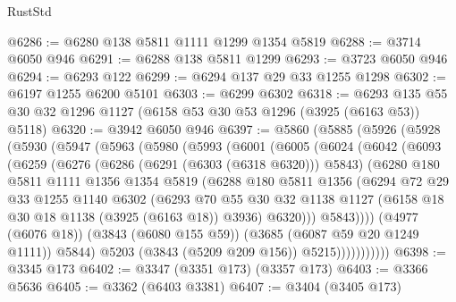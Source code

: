 \begin{lexlean}{RustStd}
\begin{coremodule}
@6286 := @6280 @138 @5811 @1111 @1299 @1354 @5819
@6288 := @3714 @6050 @946
@6291 := @6288 @138 @5811 @1299
@6293 := @3723 @6050 @946
@6294 := @6293 @122
@6299 := @6294 @137 @29 @33 @1255 @1298
@6302 := @6197 @1255 @6200 @5101
@6303 := @6299 @6302
@6318 := @6293 @135 @55 @30 @32 @1296 @1127 (@6158 @53 @30 @53 @1296 (@3925 (@6163 @53)) @5118)
@6320 := @3942 @6050 @946
@6397 := @5860
    (@5885
      (@5926
        (@5928
          (@5930
            (@5947
              (@5963
                (@5980
                  (@5993
                    (@6001
                      (@6005
                        (@6024
                          (@6042
                            (@6093
                              (@6259
                                (@6276
                                  (@6286 (@6291 (@6303 (@6318 @6320))) @5843)
                                  (@6280
                                    @180
                                    @5811
                                    @1111
                                    @1356
                                    @1354
                                    @5819
                                    (@6288
                                      @180
                                      @5811
                                      @1356
                                      (@6294
                                        @72
                                        @29
                                        @33
                                        @1255
                                        @1140
                                        @6302
                                        (@6293
                                          @70
                                          @55
                                          @30
                                          @32
                                          @1138
                                          @1127
                                          (@6158 @18 @30 @18 @1138 (@3925 (@6163 @18)) @3936)
                                          @6320)))
                                    @5843))))
                            (@4977 (@6076 @18))
                            (@3843 (@6080 @155 @59))
                            (@3685 (@6087 @59 @20 @1249 @1111))
                            @5844)
                          @5203
                          (@3843 (@5209 @209 @156))
                          @5215)))))))))))
@6398 := @3345 @173
@6402 := @3347 (@3351 @173) (@3357 @173)
@6403 := @3366 @5636
@6405 := @3362 (@6403 @3381)
@6407 := @3404 (@3405 @173)

\end{coremodule}
\end{lexlean}
